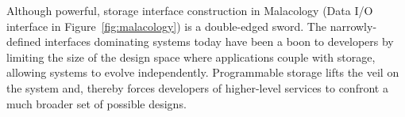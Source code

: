 Although powerful, storage interface construction in Malacology (Data I/O interface in
Figure~\ref{fig:malacology}) is a double-edged
sword. The narrowly-defined interfaces dominating systems today have been a
boon to developers by limiting the size of the design space where applications
couple with storage, allowing systems to evolve independently. Programmable
storage lifts the veil on the system and, thereby forces developers of
higher-level services to confront a much broader set of possible
designs.
